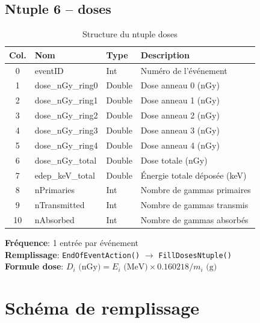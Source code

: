 \documentclass[11pt,a4paper]{article}
\begin{document}
\subsection{Ntuple 6 -- doses}

\begin{table}[h]
\centering
\begin{tabular}{clll}
\toprule
\rowcolor{headerblue!20}
\textbf{Col.} & \textbf{Nom} & \textbf{Type} & \textbf{Description} \\
\midrule
0 & eventID & Int & Numéro de l'événement \\
\rowcolor{lightgray}
1 & dose\_nGy\_ring0 & Double & Dose anneau 0 (nGy) \\
2 & dose\_nGy\_ring1 & Double & Dose anneau 1 (nGy) \\
\rowcolor{lightgray}
3 & dose\_nGy\_ring2 & Double & Dose anneau 2 (nGy) \\
4 & dose\_nGy\_ring3 & Double & Dose anneau 3 (nGy) \\
\rowcolor{lightgray}
5 & dose\_nGy\_ring4 & Double & Dose anneau 4 (nGy) \\
6 & dose\_nGy\_total & Double & Dose totale (nGy) \\
\rowcolor{lightgray}
7 & edep\_keV\_total & Double & Énergie totale déposée (keV) \\
8 & nPrimaries & Int & Nombre de gammas primaires \\
\rowcolor{lightgray}
9 & nTransmitted & Int & Nombre de gammas transmis \\
10 & nAbsorbed & Int & Nombre de gammas absorbés \\
\bottomrule
\end{tabular}
\caption{Structure du ntuple doses}
\end{table}

\textbf{Fréquence}: 1 entrée par événement\\
\textbf{Remplissage}: \texttt{EndOfEventAction()} $\rightarrow$ \texttt{FillDosesNtuple()}\\
\textbf{Formule dose}: $D_i \text{ (nGy)} = E_i \text{ (MeV)} \times 0.160218 / m_i \text{ (g)}$

\section{Schéma de remplissage}
\end{document}
